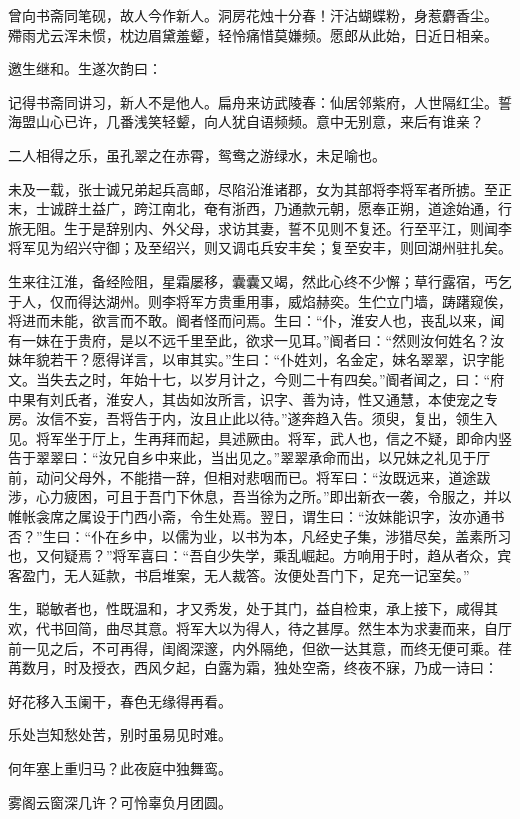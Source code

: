 \documentclass[a4paper,12pt,UTF8,twoside]{ctexbook}
\begin{document}
曾向书斋同笔砚，故人今作新人。洞房花烛十分春！汗沾蝴蝶粉，身惹麝香尘。 殢雨尤云浑未惯，枕边眉黛羞颦，轻怜痛惜莫嫌频。愿郎从此始，日近日相亲。

邀生继和。生遂次韵曰：

记得书斋同讲习，新人不是他人。扁舟来访武陵春：仙居邻紫府，人世隔红尘。誓海盟山心已许，几番浅笑轻颦，向人犹自语频频。意中无别意，来后有谁亲？

二人相得之乐，虽孔翠之在赤霄，鸳鸯之游绿水，未足喻也。

未及一载，张士诚兄弟起兵高邮，尽陷沿淮诸郡，女为其部将李将军者所掳。至正末，士诚辟土益广，跨江南北，奄有浙西，乃通款元朝，愿奉正朔，道途始通，行旅无阻。生于是辞别内、外父母，求访其妻，誓不见则不复还。行至平江，则闻李将军见为绍兴守御；及至绍兴，则又调屯兵安丰矣；复至安丰，则回湖州驻扎矣。

生来往江淮，备经险阻，星霜屡移，囊囊又竭，然此心终不少懈；草行露宿，丐乞于人，仅而得达湖州。则李将军方贵重用事，威焰赫奕。生伫立门墙，踌躇窥俟，将进而未能，欲言而不敢。阍者怪而问焉。生曰：“仆，淮安人也，丧乱以来，闻有一妹在于贵府，是以不远千里至此，欲求一见耳。”阍者曰：“然则汝何姓名？汝妹年貌若干？愿得详言，以审其实。”生曰：“仆姓刘，名金定，妹名翠翠，识字能文。当失去之时，年始十七，以岁月计之，今则二十有四矣。”阍者闻之，曰：“府中果有刘氏者，淮安人，其齿如汝所言，识字、善为诗，性又通慧，本使宠之专房。汝信不妄，吾将告于内，汝且止此以待。”遂奔趋入告。须臾，复出，领生入见。将军坐于厅上，生再拜而起，具述厥由。将军，武人也，信之不疑，即命内竖告于翠翠曰：“汝兄自乡中来此，当出见之。”翠翠承命而出，以兄妹之礼见于厅前，动问父母外，不能措一辞，但相对悲咽而已。将军曰：“汝既远来，道途跋涉，心力疲困，可且于吾门下休息，吾当徐为之所。”即出新衣一袭，令服之，并以帷帐衾席之属设于门西小斋，令生处焉。翌日，谓生曰：“汝妹能识字，汝亦通书否？”生曰：“仆在乡中，以儒为业，以书为本，凡经史子集，涉猎尽矣，盖素所习也，又何疑焉？”将军喜曰：“吾自少失学，乘乱崛起。方响用于时，趋从者众，宾客盈门，无人延款，书启堆案，无人裁答。汝便处吾门下，足充一记室矣。”

生，聪敏者也，性既温和，才又秀发，处于其门，益自检束，承上接下，咸得其欢，代书回简，曲尽其意。将军大以为得人，待之甚厚。然生本为求妻而来，自厅前一见之后，不可再得，闺阁深邃，内外隔绝，但欲一达其意，而终无便可乘。荏苒数月，时及授衣，西风夕起，白露为霜，独处空斋，终夜不寐，乃成一诗曰：

好花移入玉阑干，春色无缘得再看。

乐处岂知愁处苦，别时虽易见时难。

何年塞上重归马？此夜庭中独舞鸾。

雾阁云窗深几许？可怜辜负月团圆。
\end{document}
